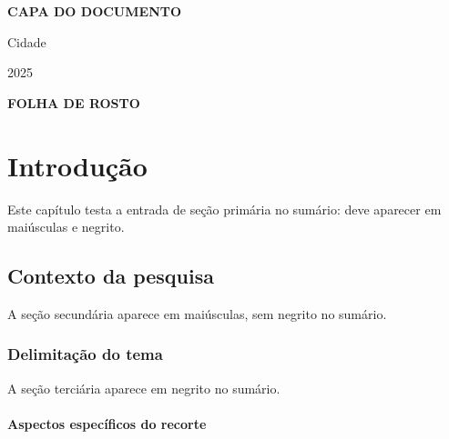 \documentclass[a4paper, 12pt]{report}
\begin{document}
\pagestyle{empty}

\begin{titlepage}
  \centering\vfill
  {\Large\bfseries CAPA DO DOCUMENTO}\par
  \vfill
  Cidade\par 2025
\end{titlepage}

\begin{titlepage}
  \centering\vfill
  {\Large\bfseries FOLHA DE ROSTO}\par
  \vfill
\end{titlepage}

\imprimirsumario

\chapter{Introdução}

Este capítulo testa a entrada de seção primária no sumário: deve aparecer em
maiúsculas e negrito.

\section{Contexto da pesquisa}

A seção secundária aparece em maiúsculas, sem negrito no sumário.

\subsection{Delimitação do tema}

A seção terciária aparece em negrito no sumário.

\subsubsection{Aspectos específicos do recorte}
\end{document}
